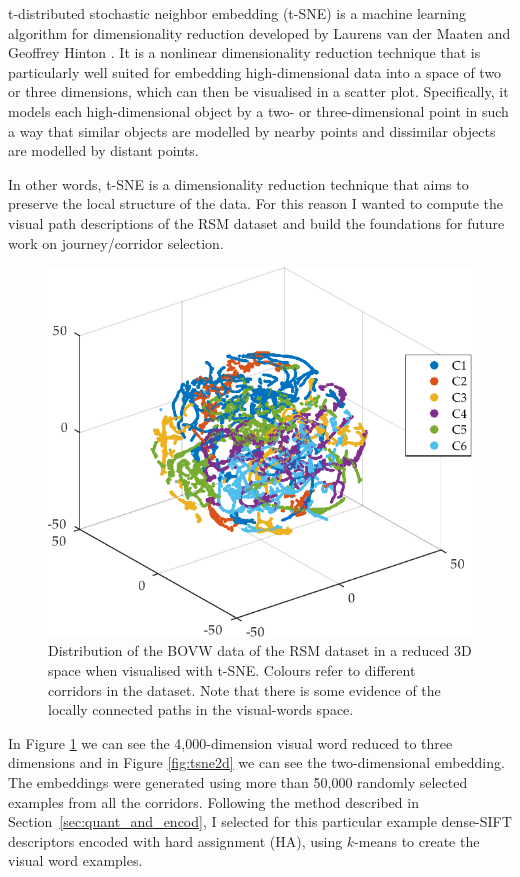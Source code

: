 t-distributed stochastic neighbor embedding (t-SNE) is a machine learning algorithm for dimensionality reduction developed by Laurens van der Maaten and Geoffrey Hinton \cite{maaten2009learning}. It is a nonlinear dimensionality reduction technique that is particularly well suited for embedding high-dimensional data into a space of two or three dimensions, which can then be visualised in a scatter plot. Specifically, it models each high-dimensional object by a two- or three-dimensional point in such a way that similar objects are modelled by nearby points and dissimilar objects are modelled by distant points.

In other words, t-SNE is a dimensionality reduction technique that aims to preserve the local structure of the data. For this reason I wanted to compute the visual path descriptions of the RSM dataset and build the foundations for future work on journey/corridor selection.

\begin{figure}
\centering
\includegraphics[width=\textwidth]{gfx/Chapter04/tsne_dsift_3d.pdf}
\caption{Distribution of the BOVW data of the RSM dataset in a reduced 3D space when visualised with t-SNE. Colours refer to different corridors in the dataset. Note that there is some evidence of the locally connected paths in the visual-words space.}
\label{fig:tsne3d}
\end{figure}

In Figure \ref{fig:tsne3d} we can see the 4,000-dimension visual word reduced to three dimensions and in Figure \ref{fig:tsne2d} we can see the two-dimensional embedding. The embeddings were generated using more than 50,000 randomly selected examples from all the corridors. Following the method described in Section~\ref{sec:quant_and_encod}, I selected for this particular example dense-SIFT descriptors encoded with hard assignment (HA), using $k$-means to create the visual word examples.

